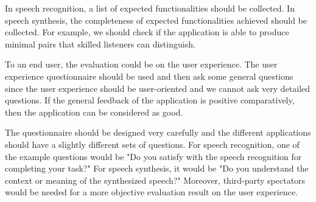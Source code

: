 \documentclass[12pt]{article}
\newenvironment{problem}[2][Problem]{\begin{trivlist}
\item[\hskip \labelsep {\bfseries #1}\hskip \labelsep {\bfseries #2.}]}{\end{trivlist}}
\begin{document}
\begin{problem}{5.2}
    In speech recognition, a list of expected functionalities should be collected. 
    In speech synthesis, the completeness of expected functionalities achieved 
    should be collected. For example, we should check if the application is 
    able to produce minimal pairs that skilled listeners can distinguish.

    To an end user, the evaluation could be on the user experience. 
    The user experience questionnaire should be used and then ask some general 
    questions since the user experience should be user-oriented and we cannot 
    ask very detailed questions. If the general feedback of the application is
    positive comparatively, then the application can be considered as good. 

    The questionnaire should be designed very carefully and the different 
    applications should have a slightly different sets of questions. 
    For speech recognition, one of the example questions would be 
    "Do you satisfy with the speech recognition for completing your task?" 
    For speech synthesis, it would be "Do you understand the context or meaning of the synthesized speech?"
    Moreover, third-party spectators would be needed for a more objective 
    evaluation result on the user experience.
\end{problem}
\end{document}
